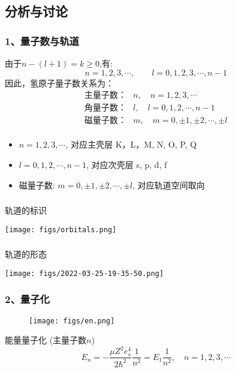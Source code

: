 \subsection{分析与讨论}

\begin{frame}[label=current]
\frametitle{1、量子数与轨道}
由于${n-(l+1) = k \ge 0}$,有:
\[n=1,2,3,\cdots, \qquad l=0,1,2,3,\cdots, n-1\]
因此，氢原子量子数关系为：
\[
  \begin{aligned}
    \text{主量子数：} &n, \quad n=1,2,3, \cdots  \\ 
    \text{角量子数：} &l, \quad l=0,1,2, \cdots, n-1 \\ 
    \text{磁量子数：} &m, \quad m=0,\pm 1, \pm 2, \cdots, \pm l \\ 
  \end{aligned} 
  \]
  \begin{itemize}
        \item $n=1,2,3,\cdots$, 对应主壳层 K，L，M, N, O, P, Q 
        \item $l=0,1,2,\cdots, n-1$, 对应次壳层 s, p, d, f
        \item 磁量子数: $m=0,\pm 1,\pm 2,\cdots, \pm l$, 对应轨道空间取向
  \end{itemize}
\end{frame} 


\begin{frame}
  \frametitle{}
  轨道的标识
  \begin{center}
  \texttt{[image: figs/orbitals.png]}
 \end{center}
\end{frame}

\begin{frame}
  \frametitle{}
  轨道的形态
  \begin{center}
     \texttt{[image: figs/2022-03-25-19-35-50.png]}
  \end{center}	 
\end{frame}	

\begin{frame}[label=current]
  \frametitle{ 2、量子化}
\begin{figure}[htbp]
  \centering
  \texttt{[image: figs/en.png]}
\end{figure} 
能量量子化 (主量子数$n$)
  $$
E_n=-\frac{\mu Z^2 e_s^4}{2 \hbar^2} \frac{1}{n^2}=E_1 \frac{1}{n^2}, \quad n=1, 2, 3, \cdots 
$$
\end{frame} 

